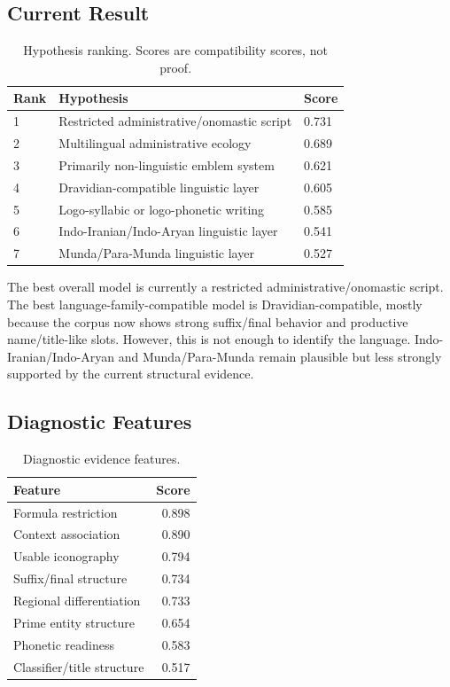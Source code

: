 \subsection{Current Result}

\begin{table}[htbp]
\centering
\begin{tabular}{lp{}l}
\toprule
\textbf{Rank} & \textbf{Hypothesis} & \textbf{Score} \\
\midrule
1 & Restricted administrative/onomastic script & 0.731 \\
2 & Multilingual administrative ecology & 0.689 \\
3 & Primarily non-linguistic emblem system & 0.621 \\
4 & Dravidian-compatible linguistic layer & 0.605 \\
5 & Logo-syllabic or logo-phonetic writing & 0.585 \\
6 & Indo-Iranian/Indo-Aryan linguistic layer & 0.541 \\
7 & Munda/Para-Munda linguistic layer & 0.527 \\
\bottomrule
\end{tabular}
\caption{Hypothesis ranking. Scores are compatibility scores, not proof.}
\label{tab:language-hypothesis-ranking}
\end{table}

The best overall model is currently a restricted administrative/onomastic script. The best language-family-compatible model is Dravidian-compatible, mostly because the corpus now shows strong suffix/final behavior and productive name/title-like slots. However, this is not enough to identify the language. Indo-Iranian/Indo-Aryan and Munda/Para-Munda remain plausible but less strongly supported by the current structural evidence.

\subsection{Diagnostic Features}

\begin{table}[htbp]
\centering
\begin{tabular}{lr}
\toprule
\textbf{Feature} & \textbf{Score} \\
\midrule
Formula restriction & 0.898 \\
Context association & 0.890 \\
Usable iconography & 0.794 \\
Suffix/final structure & 0.734 \\
Regional differentiation & 0.733 \\
Prime entity structure & 0.654 \\
Phonetic readiness & 0.583 \\
Classifier/title structure & 0.517 \\
\bottomrule
\end{tabular}
\caption{Diagnostic evidence features.}
\label{tab:language-diagnostic-features}
\end{table}

